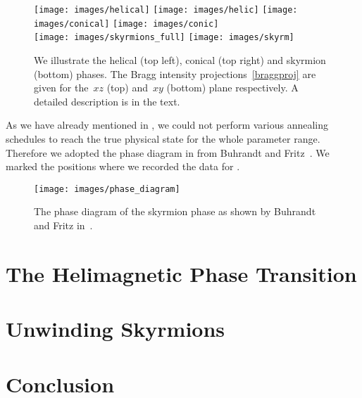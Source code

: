 \begin{figure}
  \centering
  \texttt{[image: images/helical]}
  \hspace{0.5cm}
  \texttt{[image: images/helic]}
  \hfill
  \texttt{[image: images/conical]}
  \hspace{0.5cm}
  \texttt{[image: images/conic]}\\
  \vspace{1.5cm}
  \texttt{[image: images/skyrmions\_full]}
  \hspace{1cm}
  \texttt{[image: images/skyrm]}
  \caption{We illustrate the helical (top left), conical (top right) and
  skyrmion (bottom) phases. The Bragg intensity projections~\eqref{braggproj}
  are given for the~$xz$ (top) and~$xy$ (bottom) plane respectively. A detailed
  description is in the text.}
\label{fig:phases}
\end{figure}

As we have already mentioned in , we could not perform
various annealing schedules to reach the true physical state for the whole
parameter range. Therefore we adopted the phase diagram in 
from Buhrandt and Fritz~\cite{skyrmion}. We marked the positions where we
recorded the data for .

\begin{figure}
  \centering
  \texttt{[image: images/phase\_diagram]}
  \caption{The phase diagram of the skyrmion phase as shown by Buhrandt and
  Fritz in~\cite{skyrmion}.}
\label{fig:diagram}
\end{figure}
%
\section{The Helimagnetic Phase Transition}\label{sec:details}
%
%
\section{Unwinding Skyrmions}\label{sec:transitions}
%
%
\section{Conclusion}\label{sec:conclusion}
%
